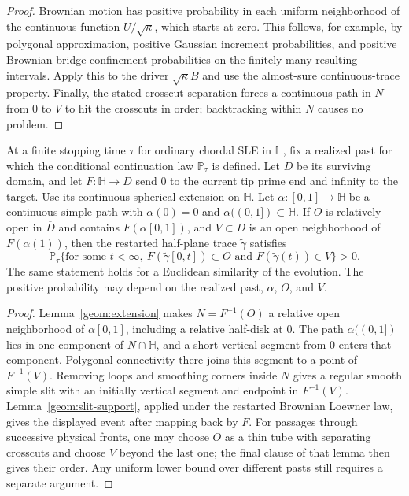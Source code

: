 \begin{proof}
Brownian motion has positive probability in each uniform
neighborhood of the continuous function $U/\sqrt\kappa$, which
starts at zero.  This follows, for example, by polygonal approximation,
positive Gaussian increment probabilities, and positive Brownian-bridge
confinement probabilities on the finitely many resulting intervals.
Apply this to the driver $\sqrt\kappa B$ and use the almost-sure
continuous-trace property.  Finally, the stated crosscut separation
forces a continuous path in $N$ from $0$ to $V$ to hit the crosscuts
in order; backtracking within $N$ causes no problem.
\end{proof}

\begin{corollary}
\label{geom:restart-support}
At a finite stopping time $\tau$ for ordinary chordal SLE in
$\mathbb H$, fix a realized past for which the conditional continuation
law $\mathbb P_\tau$ is defined.  Let $D$ be its surviving domain, and
let $F:\mathbb H\to D$ send $0$ to the current tip prime end and infinity
to the target.  Use its continuous spherical extension on
$\overline{\mathbb H}$.  Let
$\alpha:[0,1]\to\overline{\mathbb H}$ be a continuous simple path with
$\alpha(0)=0$ and $\alpha((0,1])\subset\mathbb H$.
If $O$ is relatively open in $\overline D$ and contains
$F(\alpha[0,1])$, and $V\subset D$ is an open neighborhood of
$F(\alpha(1))$, then the restarted half-plane trace $\widetilde\gamma$
satisfies
\[
 \mathbb P_\tau\{\text{for some }t<\infty,
   \ F(\widetilde\gamma[0,t])\subset O
       \text{ and }F(\widetilde\gamma(t))\in V\}>0.
\]
The same statement holds for a Euclidean similarity of the evolution.
The positive probability may depend on the realized past, $\alpha$,
$O$, and $V$.
\end{corollary}

\begin{proof}
Lemma~\ref{geom:extension} makes $N=F^{-1}(O)$ a relative open
neighborhood of $\alpha[0,1]$, including a relative half-disk at $0$.
The path $\alpha((0,1])$ lies in one component of $N\cap\mathbb H$,
and a short vertical segment from $0$ enters that component.  Polygonal
connectivity there joins this segment to a point of $F^{-1}(V)$.
Removing loops and smoothing corners inside $N$ gives a regular smooth
simple slit with an initially vertical segment and endpoint in
$F^{-1}(V)$.
Lemma~\ref{geom:slit-support}, applied under the restarted Brownian
Loewner law, gives the displayed event after mapping back by $F$.
For passages through successive physical fronts, one may choose $O$
as a thin tube with separating crosscuts and choose $V$ beyond the
last one; the final clause of that lemma then gives their order.
Any uniform lower bound over different pasts still requires a
separate argument.
\end{proof}
